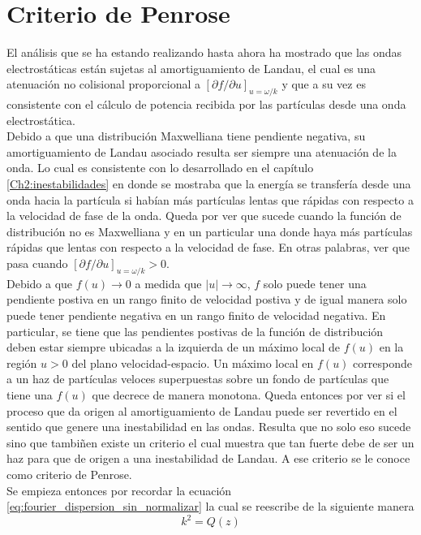 \documentclass[../tesis_main_file.tex]{subfiles}
\begin{document}
\section{Criterio de Penrose}
El análisis que se ha estando realizando hasta ahora ha mostrado que las ondas electrostáticas están sujetas al amortiguamiento de Landau,
el cual es una atenuación no colisional proporcional a $[\partial f / \partial u]_{u=\omega / k}$ y que a su vez es consistente con el cálculo de potencia recibida por las partículas desde una onda electrostática.\\
Debido a que una distribución Maxwelliana tiene pendiente negativa, su amortiguamiento de Landau asociado resulta ser siempre una atenuación de la onda.
Lo cual es consistente con lo desarrollado en el capítulo \ref{Ch2:inestabilidades} en donde se mostraba que la energía se transfería desde una onda hacia la partícula si habían más partículas lentas que rápidas con respecto a la velocidad de fase de la onda.
Queda por ver que sucede cuando la función de distribución no es Maxwelliana y en un particular una donde haya más partículas rápidas que lentas con respecto a la velocidad de fase.
En otras palabras, ver que pasa cuando $[\partial f / \partial u]_{u=\omega / k} > 0$.\\
Debido a que $f(u) \to 0$ a medida que $|u| \to \infty $, $f$ solo puede tener una pendiente postiva en un rango finito de velocidad postiva y de igual manera solo puede tener pendiente negativa en un rango finito de velocidad negativa.
En particular, se tiene que las pendientes postivas de la función de distribución deben estar siempre ubicadas a la izquierda de un máximo local de $f(u)$ en la región $u>0$ del plano velocidad-espacio.
Un máximo local en $f(u)$ corresponde a un haz de partículas veloces superpuestas sobre un fondo de partículas que tiene una $f(u)$ que decrece de manera monotona.
Queda entonces por ver si el proceso que da origen al amortiguamiento de Landau puede ser revertido en el sentido que genere una inestabilidad en las ondas.
Resulta que no solo eso sucede sino que tambiñen existe un criterio el cual muestra que tan fuerte debe de ser un haz para que de origen a una inestabilidad de Landau. A ese criterio se le conoce como criterio de Penrose. \cite{bellan2008fundamentals}\\
Se empieza entonces por recordar la ecuación \ref{eq:fourier_dispersion_sin_normalizar} la cual se reescribe de la siguiente manera
\begin{equation}
\label{eq:k2=Q}
k^2 =Q(z)
\end{equation}
\end{document}
